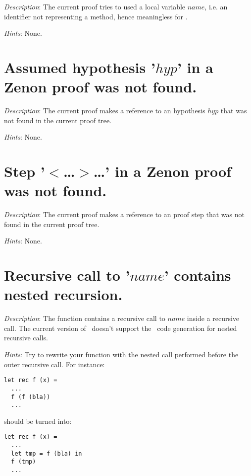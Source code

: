 {\em Description}: The current proof tries to used a local variable
$name$, i.e. an identifier not representing a method, hence
meaningless for \zenon.

{\em Hints}: None.



\section*{Assumed hypothesis '$hyp$' in a Zenon proof was not found.}

{\em Description}: The current proof makes a reference to an
hypothesis $hyp$ that was not found in the current proof tree.

{\em Hints}: None.



\section*{Step '$<$\ldots$>$\ldots' in a Zenon proof was not found.}

{\em Description}: The current proof makes a reference to an
proof step that was not found in the current proof tree.

{\em Hints}: None.


\section*{Recursive call to '$name$' contains nested recursion.}

{\em Description}: The function contains a recursive call to $name$
inside a recursive call. The current version of \focal\ doesn't
support the \coq\ code generation for nested recursive calls.

{\em Hints}: Try to rewrite your function with the nested call
performed before the outer recursive call. For instance:
{\scriptsize
\begin{lstlisting}
let rec f (x) =
  ...
  f (f (bla))
  ...
\end{lstlisting}
}
should be turned into:
{\scriptsize
\begin{lstlisting}
let rec f (x) =
  ...
  let tmp = f (bla) in
  f (tmp)
  ...
\end{lstlisting}
}




